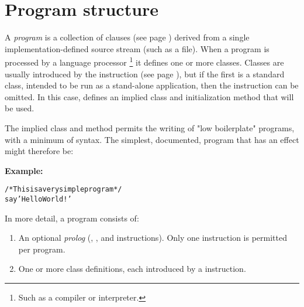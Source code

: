 \chapter{Program structure}\label{refpstruct}
 A \nr{} \emph{program} is a collection of
 clauses (see page \pageref{refclau})  derived from a single implementation-defined
source stream (such as a file).
When a program is processed by a language processor
\footnote{
Such as a compiler or interpreter.
}
it defines one or more classes.
Classes are usually introduced by the   instruction (see page \pageref{refclass}), but if the first is a standard class, intended to be
run as a stand-alone application, then the  instruction
can be omitted.  In this case, \nr{} defines an implied class
and initialization method that will be used.
 
The implied class and method permits the writing of "low
boilerplate" programs, with a minimum of syntax.
The simplest, documented, \nr{} program that has an effect might
therefore be:
 
\textbf{Example:}
\begin{alltt}
/* This is a very simple \nr{} program */
say 'Hello World!'
\end{alltt}
 
In more detail, a \nr{} program consists of:
\begin{enumerate}
\item An optional \emph{prolog} (, , and
 instructions).  Only one  instruction
is permitted per program.
\item  One or more class definitions, each introduced by a 
instruction.
\end{enumerate}
 
